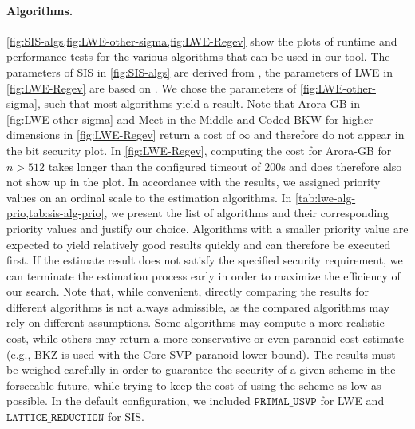 \paragraph{Algorithms.} \label{sec:tool-algorithms} \cref{fig:SIS-algs,fig:LWE-other-sigma,fig:LWE-Regev} show the plots of runtime and performance tests for the various algorithms that can be used in our tool. The parameters of SIS in \cref{fig:SIS-algs} are derived from \cite{MP12}, the parameters of LWE in \cref{fig:LWE-Regev} are based on \cite{Reg05}. We chose the parameters of \cref{fig:LWE-other-sigma}, such that most algorithms yield a result. Note that Arora-GB in \cref{fig:LWE-other-sigma} and Meet-in-the-Middle and Coded-BKW for higher dimensions in \cref{fig:LWE-Regev} return a cost of $\infty$ and therefore do not appear in the bit security plot. In \cref{fig:LWE-Regev}, computing the cost for Arora-GB for $n>512$ takes longer than the configured timeout of $200$s and does therefore also not show up in the plot. In accordance with the results, we assigned priority values on an ordinal scale to the estimation algorithms. In \cref{tab:lwe-alg-prio,tab:sis-alg-prio}, we present the list of algorithms and their corresponding priority values and justify our choice. Algorithms with a smaller priority value are expected to yield relatively good results quickly and can therefore be executed first. If the estimate result does not satisfy the specified security requirement, we can terminate the estimation process early in order to maximize the efficiency of our search. Note that, while convenient, directly comparing the results for different algorithms is not always admissible, as the compared algorithms may rely on different assumptions. Some algorithms may compute a more realistic cost, while others may return a more conservative or even paranoid cost estimate (e.g., BKZ is used with the Core-SVP paranoid lower bound). The results must be weighed carefully in order to guarantee the security of a given scheme in the forseeable future, while trying to keep the cost of using the scheme as low as possible. In the default configuration, we included $\texttt{PRIMAL\_USVP}$ for LWE and $\texttt{LATTICE\_REDUCTION}$ for SIS. %
